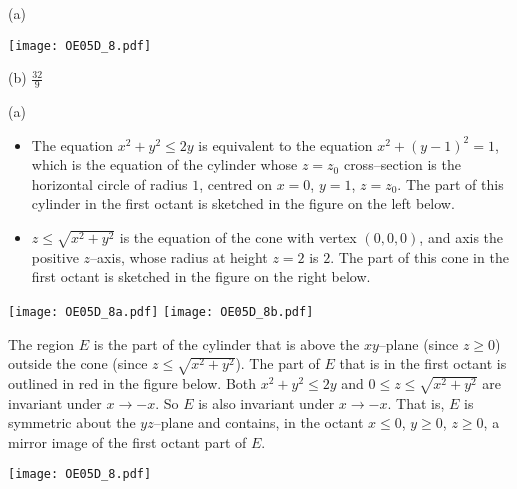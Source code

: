 \begin{answer}
(a)
\begin{center}
     \texttt{[image: OE05D\_8.pdf]}
\end{center}

(b) $\frac{32}{9}$
\end{answer}

\begin{solution}
(a) 
\begin{itemize}
\item
The equation $x^2 + y^2 \le 2y$ is equivalent to the
equation $x^2 + (y-1)^2=1$, which is the equation of the cylinder whose
$z=z_0$ cross--section is the horizontal circle of radius $1$, centred on 
$x=0$, $y=1$, $z=z_0$. The part of this cylinder in the first octant is
sketched in the figure on the left below.

\item
$z \le \sqrt{x^2 + y^2}$ is the equation of the cone with vertex $(0,0,0)$,
and axis the positive $z$--axis, whose radius at height $z=2$ is $2$.
The part of this cone in the first octant is sketched in the figure
on the right below.

\end{itemize}

\begin{center}
     \texttt{[image: OE05D\_8a.pdf]}\quad
     \texttt{[image: OE05D\_8b.pdf]}
\end{center}

The region $E$ is the part of the cylinder that is above the
$xy$--plane (since $z\ge 0$) outside the cone (since $z\le\sqrt{x^2+y^2}$).
The part of $E$ that is in the first octant is outlined in red in the
figure below. Both $x^2 + y^2 \le 2y$ and $0 \le z \le \sqrt{x^2 + y^2}$
are invariant under $x\rightarrow -x$. So $E$ is also invariant
under $x\rightarrow -x$. That is, $E$ is symmetric about the $yz$--plane
and contains, in the octant $x\le 0$, $y\ge 0$, $z\ge 0$, a mirror
image of the first octant part of $E$.

\begin{center}
     \texttt{[image: OE05D\_8.pdf]}
\end{center}


\end{solution}
